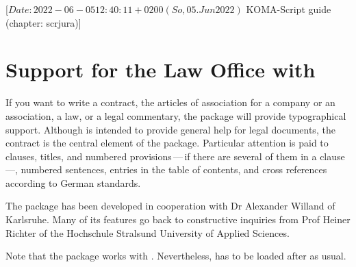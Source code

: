 %
%
%
%
%
%
%

%
                 [$Date: 2022-06-05 12:40:11 +0200 (So, 05. Jun 2022) $
                  KOMA-Script guide (chapter: scrjura)]


\chapter{Support for the Law Office with }
\BeginIndexGroup
{}

If you want to write a contract, the articles of association
for a company or an association, a law, or a legal commentary, the package
 will provide typographical support. Although
 is intended to provide general help for legal documents, the
contract is the central element of the package. Particular attention is paid
to clauses, titles, and numbered provisions\,---\,if there are several of
them in a clause\,---, numbered sentences, entries in the table of
contents, and cross references according to German standards.

The package has been developed in cooperation with Dr Alexander Willand of
Karlsruhe. Many of its features go back to constructive inquiries from Prof
Heiner Richter of the Hochschule Stralsund University of Applied Sciences.

Note that the package works with
. Nevertheless, 
has to be loaded after  as usual.

